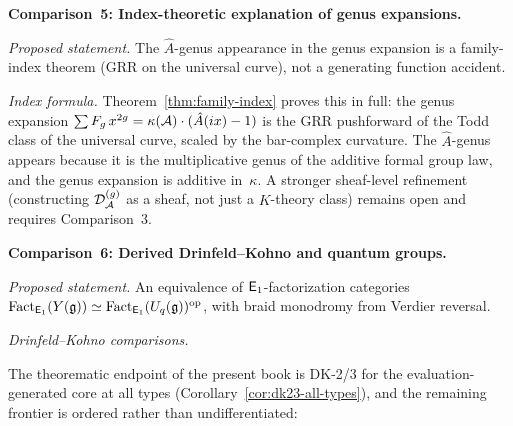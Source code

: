 \medskip

\noindent\textbf{Comparison~5: Index-theoretic explanation of genus
expansions.}

\emph{Proposed statement.}
The $\hat{A}$-genus appearance in the genus expansion is a
family-index theorem (GRR on the universal curve), not a generating
function accident.

\emph{Index formula.}
Theorem~\ref{thm:family-index} proves this in full: the genus
expansion $\sum F_g\, x^{2g} = \kappa(\mathcal{A})\cdot(\hat{A}(ix) - 1)$
is the GRR pushforward of the Todd class of the universal curve,
scaled by the bar-complex curvature.  The $\hat{A}$-genus appears
because it is the multiplicative genus of the additive formal
group law, and the genus expansion is additive in~$\kappa$.
A stronger sheaf-level refinement (constructing
$\mathcal{D}_{\mathcal{A}}^{(g)}$ as a sheaf, not just a $K$-theory
class) remains open and requires Comparison~3.

\medskip

\noindent\textbf{Comparison~6: Derived Drinfeld--Kohno and quantum
groups.}

\emph{Proposed statement.}
An equivalence of $\mathsf{E}_1$-factorization categories
$\operatorname{Fact}_{\mathsf{E}_1}(Y(\mathfrak{g})) \simeq
\operatorname{Fact}_{\mathsf{E}_1}(U_q(\mathfrak{g}))^{\mathrm{op}}$,
with braid monodromy from Verdier reversal.

\emph{Drinfeld--Kohno comparisons.}

The theorematic endpoint of the present book is DK-2/3 for the
evaluation-generated core at all types
(Corollary~\ref{cor:dk23-all-types}), and the remaining
frontier is ordered rather than undifferentiated:

